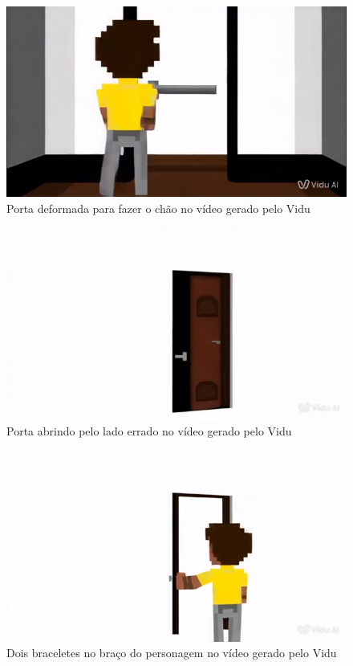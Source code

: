 

\begin{figure}[htbp]
    \centering
    \caption{\small Porta deformada para fazer o chão no vídeo gerado pelo Vidu}
    \label{fig:viduPortaChao}
    \includegraphics[width=0.6\linewidth]{figs/vidu/porta_deformada.PNG}
\end{figure}

\begin{figure}[htbp]
    \centering
    \caption{\small Porta abrindo pelo lado errado no vídeo gerado pelo Vidu}
    \label{fig:viduPortaAbrindo}
    \includegraphics[width=0.7\linewidth]{figs/vidu/porta_abrindo_lado_oposto.PNG}
\end{figure}

\begin{figure}[htbp]
    \centering
    \caption{\small Dois braceletes no braço do personagem no vídeo gerado pelo Vidu}
    \label{fig:viduDoisBraceletes}
    \includegraphics[width=0.7\linewidth]{figs/vidu/Braceletes.PNG}
\end{figure}

